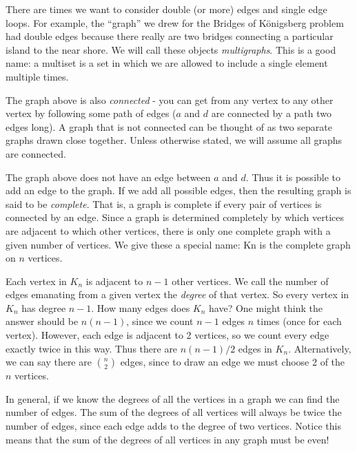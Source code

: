 \documentclass[12pt]{article}
\begin{document}
There are times we want to consider double (or more) edges and single edge loops.  For example, the ``graph'' we drew for the Bridges of K\"onigsberg problem had double edges because there really are two bridges connecting a particular island to the near shore.  We will call these objects {\em multigraphs}.  This is a good name: a multiset is a set in which we are allowed to include a single element multiple times.

The graph above is also {\em connected} - you can get from any vertex to any other vertex by following some path of edges ($a$ and $d$ are connected by a path two edges long).  A graph that is not connected can be thought of as two separate graphs drawn close together.  Unless otherwise stated, we will assume all graphs are connected.  

The graph above does not have an edge between $a$ and $d$.  Thus it is possible to add an edge to the graph.  If we add all possible edges, then the resulting graph is said to be {\em complete}.  That is, a graph is complete if every pair of vertices is connected by an edge.  Since a graph is determined completely by which vertices are adjacent to which other vertices, there is only one complete graph with a given number of vertices.  We give these a special name: \gls{Kn} is the complete graph on $n$ vertices.

Each vertex in $K_n$ is adjacent to $n-1$ other vertices.  We call the number of edges emanating from a given vertex the {\em degree} of that vertex.  So every vertex in $K_n$ has degree $n-1$.  How many edges does $K_n$ have?  One might think the answer should be $n(n-1)$, since we count $n-1$ edges $n$ times (once for each vertex).  However, each edge is adjacent to 2 vertices, so we count every edge exactly twice in this way.  Thus there are $n(n-1)/2$ edges in $K_n$.  
Alternatively, we can say there are ${n \choose 2}$ edges, since to draw an edge we must choose 2 of the $n$ vertices.

In general, if we know the degrees of all the vertices in a graph we can find the number of edges.  The sum of the degrees of all vertices will always be twice the number of edges, since each edge adds to the degree of two vertices.  Notice this means that the sum of the degrees of all vertices in any graph must be even!
\end{document}
